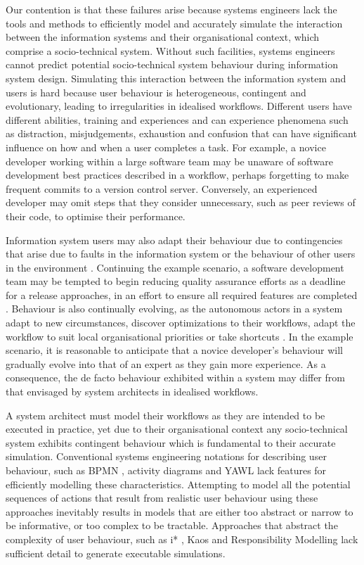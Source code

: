 \documentclass{llncs}
\begin{document}
Our contention is that these failures arise because systems engineers lack the tools and methods to efficiently model
and accurately simulate the interaction between the information systems and their organisational context, which comprise
a socio-technical system. Without such facilities, systems engineers cannot predict potential socio-technical system
behaviour during information system design. Simulating this interaction between the information system and users is hard
because user behaviour is heterogeneous, contingent and evolutionary, leading to irregularities in idealised workflows.
Different users have different abilities, training and experiences and can experience phenomena such as distraction,
misjudgements, exhaustion and confusion that can have significant influence on how and when a user completes a task.
For example, a novice developer working within a large software team may be unaware of software development best
practices described in a workflow, perhaps forgetting to make frequent commits to a version control server.  Conversely,
an experienced developer may omit steps that they consider unnecessary, such as peer reviews of their code, to optimise
their performance.

Information system users may also adapt their behaviour due to contingencies that arise due to faults in the information
system or the behaviour of other users in the environment \citep{sommerville09deriving}.  Continuing the example
scenario, a software development team may be tempted to begin reducing quality assurance efforts as a deadline for a
release approaches, in an effort to ensure all required features are completed \citep{beck02test}. Behaviour is also
continually evolving, as the autonomous actors in a system adapt to new circumstances, discover optimizations to their
workflows, adapt the workflow to suit local organisational priorities or take shortcuts \citep{bonen79evolutionary}.  In
the example scenario, it is reasonable to anticipate that a novice developer's behaviour will gradually evolve into that
of an expert as they gain more experience.  As a consequence, the de facto behaviour exhibited within a system may
differ from that envisaged by system architects in idealised workflows.

A system architect must model their workflows as they are intended to be executed in practice, yet due to their
organisational context any socio-technical system exhibits contingent behaviour which is fundamental to their accurate
simulation. Conventional systems engineering notations for describing user behaviour, such as BPMN
\citep{omg2011omgbpmn}, activity diagrams \citep{omg07omguml} and YAWL \citep{hofstede2010yawl} lack features for
efficiently modelling these characteristics.  Attempting to model all the potential sequences of actions that result
from realistic user behaviour using these approaches inevitably results in models that are either too abstract or narrow
to be informative, or too complex to be tractable.  Approaches that abstract the complexity of user behaviour, such as
i* \citep{yu1995social}, Kaos \citep{werneck2009goreistarkaos} and Responsibility Modelling
\citep{sommerville09deriving} lack sufficient detail to generate executable simulations.
\end{document}
